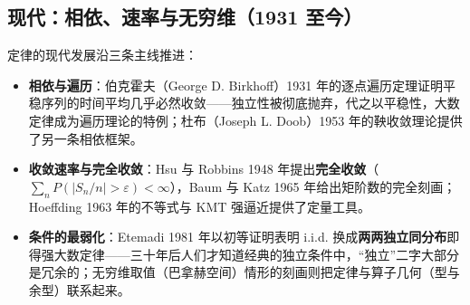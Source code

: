 \subsection{现代：相依、速率与无穷维（1931 至今）}

定律的现代发展沿三条主线推进：

\begin{itemize}
    \item \textbf{相依与遍历}：伯克霍夫（George D. Birkhoff）1931 年的逐点遍历定理\cite{birkhoff1931}证明平稳序列的时间平均几乎必然收敛——独立性被彻底抛弃，代之以平稳性，大数定律成为遍历理论的特例；杜布（Joseph L. Doob）1953 年的鞅收敛理论提供了另一条相依框架。
    \item \textbf{收敛速率与完全收敛}：Hsu 与 Robbins 1948 年\cite{hsurobbins1948}提出\textbf{完全收敛}（$\sum_n P(|S_n/n| > \varepsilon) < \infty$），Baum 与 Katz 1965 年\cite{baumkatz1965}给出矩阶数的完全刻画；Hoeffding 1963 年\cite{hoeffding1963}的不等式与 KMT 强逼近\cite{kmt1975}提供了定量工具。
    \item \textbf{条件的最弱化}：Etemadi 1981 年\cite{etemadi1981}以初等证明表明 i.i.d. 换成\textbf{两两独立同分布}即得强大数定律——三十年后人们才知道经典的独立条件中，“独立”二字大部分是冗余的；无穷维取值（巴拿赫空间）情形的刻画则把定律与算子几何（型与余型）联系起来\cite{ledouxtalagrand1991}。
\end{itemize}
